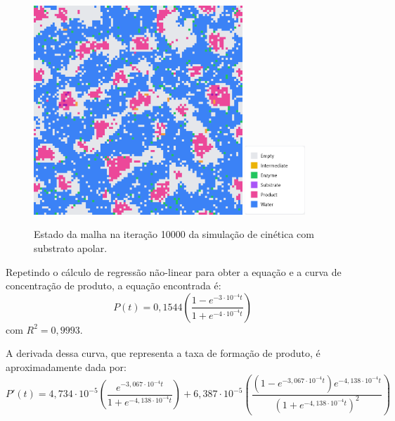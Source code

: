 \documentclass[12pt,oneside]{report}
\begin{document}
\begin{figure}[H]
    \centering
    \includegraphics[width=0.7\textwidth]{img/apolar_10000.png}
    \hspace{0.05\textwidth}
    \includegraphics[width=0.2\textwidth]{img/legend.png}
    \caption{\small Estado da malha na iteração 10000 da simulação de cinética com substrato apolar.}
    \label{fig:MM_apolar_10000it}
\end{figure}

Repetindo o cálculo de regressão não-linear para obter a equação e a curva de concentração de produto, a equação encontrada é:
\begin{equation}
    P(t) = 0{,}1544 \left(\frac{1 - e^{-3 \cdot 10^{-4} t}}{1 + e^{-4 \cdot 10^{-4} t}}\right)
    \label{eq:produto_MM_apolar}
\end{equation}
com $R^2 = 0{,}9993$.

A derivada dessa curva, que representa a taxa de formação de produto, é aproximadamente dada por:
\begin{equation}
    P'(t) = 4{,}734 \cdot 10^{-5} \left(\frac{e^{-3{,}067 \cdot 10^{-4} t}}{1 + e^{-4{,}138 \cdot 10^{-4} t}}\right) + 6{,}387 \cdot 10^{-5} \left(\frac{(1 - e^{-3{,}067 \cdot 10^{-4} t}) e^{-4{,}138 \cdot 10^{-4} t}}{(1 + e^{-4{,}138 \cdot 10^{-4} t})^2}\right)
    \label{eq:taxa_MM_apolar}
\end{equation}
\end{document}
